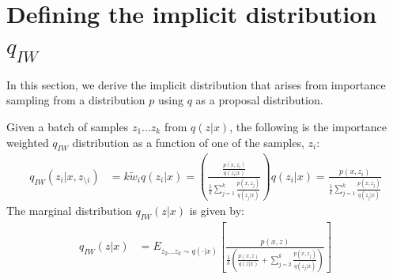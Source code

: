 \documentclass{article} %
\begin{document}
\section{Defining the implicit distribution \texorpdfstring{$q_{IW}$}{}}


In this section, we derive the implicit distribution that arises from importance sampling from a distribution $p$ using $q$ as a proposal distribution.

Given a batch of samples $z_{1}...z_{k}$ from $q(z|x)$, the following is the importance weighted $q_{IW}$ distribution as a function of one of the samples, $z_i$:
\begin{align} 
    q_{IW}(z_i|x,z_{\setminus i}) &= k \tilde{w}_i q(z_i|x)
    = \left( \frac{ \frac{p(x,z_i)}{q(z_i|x)}}{  \frac{1}{k}   \sum_{j=1}^k \frac{p(x,z_j)}{q(z_j|x)}}  \right) q(z_i|x) 
    = \frac{p(x,z_i)}{\frac{1}{k}   \sum_{j=1}^k \frac{p(x,z_j)}{q(z_j|x)}} 
\end{align}
The marginal distribution $q_{IW}(z|x)$ is given by:
\begin{align} 
    q_{IW}(z|x) &= E_{z_{2}...z_{k} \sim q(\cdot |x)} \left[ \frac{p(x,z)}{  \frac{1}{k} \left( \frac{p(x,z)}{q(z|x)}+ \sum_{j=2}^k \frac{p(x,z_j)}{q(z_j|x)} \right) } \right] \label{marg} %
\end{align}





\end{document}
